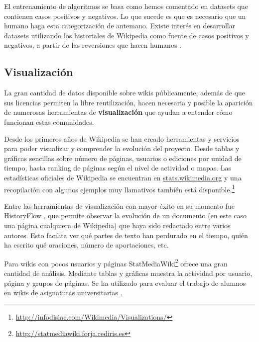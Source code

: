 \documentclass[11pt,onecolumn]{article}
\begin{document}

El entrenamiento de algoritmos se basa como hemos comentado en datasets que contienen casos positivos y negativos. Lo que sucede es que es necesario que un humano haga esta categorización de antemano. Existe interés en desarrollar datasets utilizando los historiales de Wikipedia como fuente de casos positivos y negativos, a partir de las reversiones que hacen humanos \citep{west2010}.

\subsection{Visualización}


La gran cantidad de datos disponible sobre wikis públicamente, además de que sus licencias permiten la libre reutilización, hacen necesaria y posible la aparición de numerosas herramientas de \textbf{visualización} que ayudan a entender cómo funcionan estas comunidades.

Desde los primeros años de Wikipedia se han creado herramientas y servicios para poder visualizar y comprender la evolución del proyecto. Desde tablas y gráficas sencillas sobre número de páginas, usuarios o ediciones por unidad de tiempo, hasta ranking de páginas según el nivel de actividad o mapas. Las estadísticas oficiales de Wikipedia se encuentran en \href{http://stats.wikimedia.org}{stats.wikimedia.org} y una recopilación con algunos ejemplos muy llamativos también está disponible.\footnote{\href{http://infodisiac.com/Wikimedia/Visualizations/}{http://infodisiac.com/Wikimedia/Visualizations/}}


Entre las herramientas de visualización con mayor éxito en su momento fue HistoryFlow \citep{viegas2004}, que permite observar la evolución de un documento (en este caso una página cualquiera de Wikipedia) que haya sido redactado entre varios autores. Esto facilita ver qué partes de texto han perdurado en el tiempo, quién ha escrito qué oraciones, número de aportaciones, etc.

Para wikis con pocos usuarios y páginas StatMediaWiki\footnote{\href{http://statmediawiki.forja.rediris.es}{http://statmediawiki.forja.rediris.es}} ofrece una gran cantidad de análisis. Mediante tablas y gráficas muestra la actividad por usuario, página y grupos de páginas. Se ha utilizado para evaluar el trabajo de alumnos en wikis de asignaturas universitarias \citep{rodriguez2011, palomoile2012, palomorevision2012, palomorusc2012}.
\end{document}
